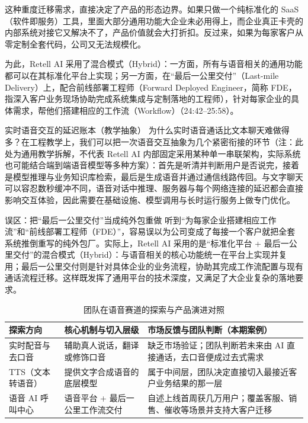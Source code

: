 \documentclass[UTF8,a4paper,11pt,fontset=fandol]{ctexart}
\begin{document}
这种重度迁移需求，直接决定了产品的形态边界。如果只做一个纯标准化的 SaaS（软件即服务）工具，里面大部分通用功能大企业未必用得上，而企业真正卡壳的内部系统对接它又解决不了，产品价值就会大打折扣。反过来，如果为每家客户从零定制全套代码，公司又无法规模化。

为此，Retell AI 采用了混合模式（Hybrid）：一方面，所有与语音相关的通用功能都可以在其标准化平台上实现；另一方面，在“最后一公里交付”（Last-mile Delivery）上，配合前线部署工程师（Forward Deployed Engineer，简称 FDE，指深入客户业务现场协助完成系统集成与定制落地的工程师），针对每家企业的具体需求，帮他们搭建相应的工作流（Workflow）（24:42–25:58）。

\begin{knowledgebox}{实时语音交互的延迟账本（教学抽象）}
为什么实时语音通话比文本聊天难做得多？在工程教学上，我们可以把一次语音交互抽象为几个紧密衔接的环节（注：此处为通用教学拆解，不代表 Retell AI 内部固定采用某种单一串联架构，实际系统也可能结合端到端语音模型等多种方案）：首先是听清并判断用户是否说完，接着是模型推理与业务知识库检索，最后是生成语音并通过通信线路传回。与文字聊天可以容忍数秒缓冲不同，语音对话中推理、服务器与每个网络连接的延迟都会直接影响交互体验，因此需要在基础设施、模型调用与长时运行服务上做专门优化。
\end{knowledgebox}
\begin{warningbox}{误区：把“最后一公里交付”当成纯外包重做}
听到“为每家企业搭建相应工作流”和“前线部署工程师（FDE）”，容易误以为公司变成了每接一个客户就把全套系统推倒重写的纯外包厂。实际上，Retell AI 采用的是“标准化平台 + 最后一公里交付”的混合模式（Hybrid）：与语音相关的核心功能统一在平台上实现并复用；最后一公里交付则是针对具体企业的业务流程，协助其完成工作流配置与现有通话流程迁移。这样既发挥了通用平台的技术深度，又满足了大企业复杂的落地要求。
\end{warningbox}
\begin{table}[H]\centering\small
\caption{团队在语音赛道的探索与产品演进对照}
\begin{tabular}{>{\raggedright\arraybackslash}p{\dimexpr(\linewidth-6\tabcolsep)/3\relax}>{\raggedright\arraybackslash}p{\dimexpr(\linewidth-6\tabcolsep)/3\relax}>{\raggedright\arraybackslash}p{\dimexpr(\linewidth-6\tabcolsep)/3\relax}}
\toprule
探索方向 & 核心机制与切入层级 & 市场反馈与团队判断（本期案例）\\\midrule
实时配音与去口音 & 辅助真人说话，翻译或修饰口音 & 缺乏市场验证；团队判断若未来由 AI 直接通话，去口音便成过去式需求\\[4pt]
TTS（文本转语音） & 提供文字合成语音的底层模型 & 属于中间层，团队决定直接切入最接近客户业务结果的那一层\\[4pt]
语音 AI 呼叫中心 & 语音平台 + 最后一公里工作流交付 & 自述上线首周获几万用户；覆盖客服、销售、催收等场景并支持大客户迁移\\[4pt]
\bottomrule\end{tabular}\end{table}
\end{document}
